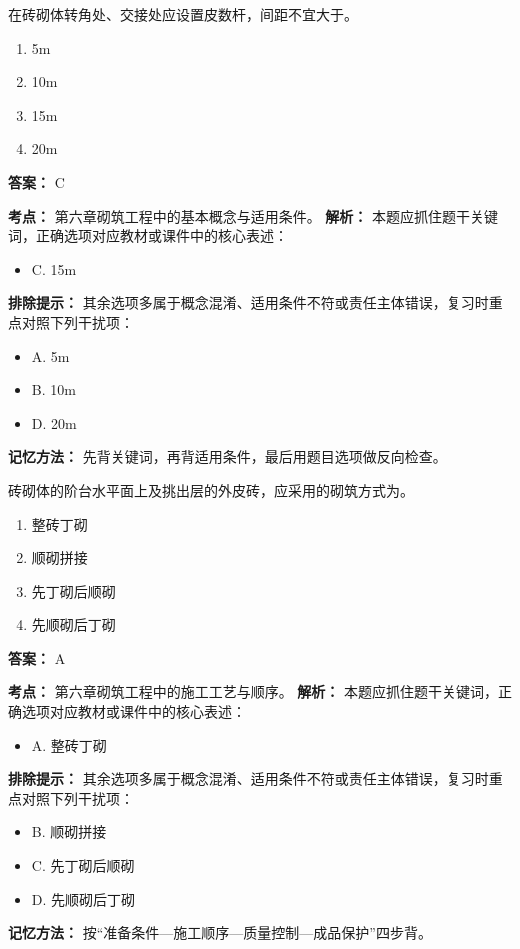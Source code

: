 \documentclass[UTF8,fontset=fandol,11pt]{ctexart}
\begin{document}
\vspace{0.2em}

\begin{quizbox}[title={第 14 题}]
在砖砌体转角处、交接处应设置皮数杆，间距不宜大于。\\
\begin{enumerate}[label=\Alph*.]
\item 5m
\item 10m
\item 15m
\item 20m
\end{enumerate}
\textbf{答案：} C
\vspace{0.25em}
\begin{answerbox}[title={考点解析}]
\textbf{考点：} 第六章砌筑工程中的基本概念与适用条件。
\textbf{解析：} 本题应抓住题干关键词，正确选项对应教材或课件中的核心表述：
\begin{itemize}
\item C. 15m
\end{itemize}
\textbf{排除提示：} 其余选项多属于概念混淆、适用条件不符或责任主体错误，复习时重点对照下列干扰项：
\begin{itemize}
\item A. 5m
\item B. 10m
\item D. 20m
\end{itemize}
\textbf{记忆方法：} 先背关键词，再背适用条件，最后用题目选项做反向检查。
\end{answerbox}
\end{quizbox}

\vspace{0.2em}

\begin{quizbox}[title={第 15 题}]
砖砌体的阶台水平面上及挑出层的外皮砖，应采用的砌筑方式为。\\
\begin{enumerate}[label=\Alph*.]
\item 整砖丁砌
\item 顺砌拼接
\item 先丁砌后顺砌
\item 先顺砌后丁砌
\end{enumerate}
\textbf{答案：} A
\vspace{0.25em}
\begin{answerbox}[title={考点解析}]
\textbf{考点：} 第六章砌筑工程中的施工工艺与顺序。
\textbf{解析：} 本题应抓住题干关键词，正确选项对应教材或课件中的核心表述：
\begin{itemize}
\item A. 整砖丁砌
\end{itemize}
\textbf{排除提示：} 其余选项多属于概念混淆、适用条件不符或责任主体错误，复习时重点对照下列干扰项：
\begin{itemize}
\item B. 顺砌拼接
\item C. 先丁砌后顺砌
\item D. 先顺砌后丁砌
\end{itemize}
\textbf{记忆方法：} 按“准备条件—施工顺序—质量控制—成品保护”四步背。
\end{answerbox}
\end{quizbox}
\end{document}
